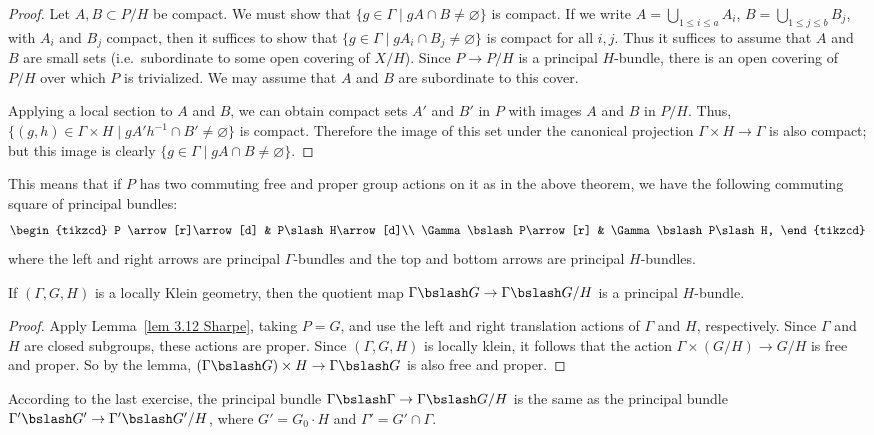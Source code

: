\begin{proof}
    Let $A,B\subset P\slash H$ be compact. We must show that $\{g\in\Gamma\mid gA\cap B\neq \varnothing\}$ is compact. If we write $A=\bigcup_{1\leq i\leq a}A_i$, $B=\bigcup_{1\leq j\leq b}B_j$, with $A_i$ and $B_j$ compact, then it suffices to show that $\{g\in\Gamma\mid gA_i\cap B_j\neq\varnothing\}$ is compact for all $i,j$. Thus it suffices to assume that $A$ and $B$ are small sets (i.e.\ subordinate to some open covering of $X\slash H$). Since $P\to P\slash H$ is a principal $H$-bundle, there is an open covering of $P\slash H$ over which $P$ is trivialized. We may assume that $A$ and $B$ are subordinate to this cover.

    Applying a local section to $A$ and $B$, we can obtain compact sets $A'$ and $B'$ in $P$ with images $A$ and $B$ in $P\slash H$. Thus, $\{(g,h)\in\Gamma\times H\mid gA' h^{-1}\cap B'\neq \varnothing\}$ is compact. Therefore the image of this set under the canonical projection $\Gamma\times H\to \Gamma$ is also compact; but this image is clearly $\{g\in\Gamma\mid gA\cap B\neq \varnothing\}$.
\end{proof}


This means that if $P$ has two commuting free and proper group actions on it as in the above theorem, we have the following commuting square of principal bundles:
\[\begin{tikzcd}
    P \arrow[r]\arrow[d] & P\slash H\arrow[d]\\
    \Gamma\bslash P\arrow[r] & \Gamma\bslash P\slash H,
\end{tikzcd}\]
where the left and right arrows are principal $\Gamma$-bundles and the top and bottom arrows are principal $H$-bundles.


\begin{cor}
    If $(\Gamma,G,H)$ is a locally Klein geometry, then the quotient map $\Gamma\bslash G\to \Gamma\bslash G\slash H$ is a principal $H$-bundle.
\end{cor}
\begin{proof}
    Apply Lemma~\ref{lem 3.12 Sharpe}, taking $P=G$, and use the left and right translation actions of $\Gamma$ and $H$, respectively. Since $\Gamma$ and $H$ are closed subgroups, these actions are proper. Since $(\Gamma,G,H)$ is locally klein, it follows that the action $\Gamma\times(G\slash H)\to G\slash H$ is free and proper. So by the lemma, $(\Gamma\bslash G)\times H\to \Gamma\bslash G$ is also free and proper.
\end{proof}

According to the last exercise, the principal bundle $\Gamma\bslash \Gamma\to \Gamma\bslash G\slash H$ is the same as the principal bundle $\Gamma'\bslash G'\to \Gamma'\bslash G'\slash H$, where $G'=G_0\cdot H$ and $\Gamma'=G'\cap\Gamma$.

